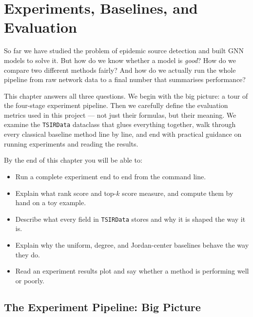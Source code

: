 \chapter{Experiments, Baselines, and Evaluation}
\label{ch:experiments}


So far we have studied the problem of epidemic source detection and built GNN models to solve it. But how do we know whether a model is \emph{good}? How do we compare two different methods fairly? And how do we actually run the whole pipeline from raw network data to a final number that summarises performance?

This chapter answers all three questions. We begin with the big picture: a tour of the four-stage experiment pipeline. Then we carefully define the evaluation metrics used in this project --- not just their formulas, but their meaning. We examine the \texttt{TSIRData} dataclass that glues everything together, walk through every classical baseline method line by line, and end with practical guidance on running experiments and reading the results.

By the end of this chapter you will be able to:
\begin{itemize}
    \item Run a complete experiment end to end from the command line.
    \item Explain what rank score and top-$k$ score measure, and compute them by hand on a toy example.
    \item Describe what every field in \texttt{TSIRData} stores and why it is shaped the way it is.
    \item Explain why the uniform, degree, and Jordan-center baselines behave the way they do.
    \item Read an experiment results plot and say whether a method is performing well or poorly.
\end{itemize}

\section{The Experiment Pipeline: Big Picture}
\label{sec:pipeline}


